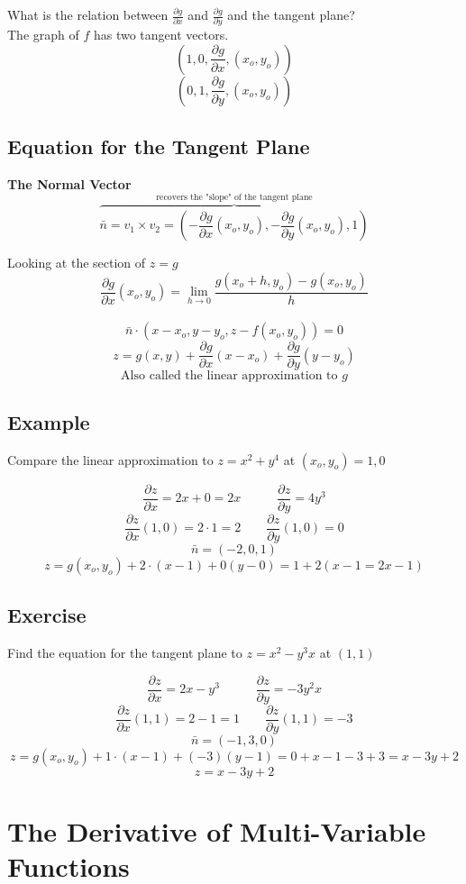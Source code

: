 \documentclass{article}
\begin{document}
What is the relation between $\frac{\partial g}{\partial x}$ and $\frac{\partial g}{\partial y}$ and the tangent plane?\\

The graph of $f$ has two tangent vectors.
\[(1,0,\frac{\partial g}{\partial x},(x_o,y_o))\]
\[(0,1,\frac{\partial g}{\partial y},(x_o,y_o))\]

\subsection{Equation for the Tangent Plane}

\textbf{The Normal Vector}
\[\overbrace{\bar{n}=v_1\times v_2=(-\frac{\partial g}{\partial x}(x_o,y_o),-\frac{\partial g}{\partial y}(x_o,y_o),1)}^{\mbox{recovers the "slope" of the tangent plane}}\]

Looking at the section of $z=g$
\[\frac{\partial g}{\partial x}(x_o,y_o)=\lim_{h\rightarrow 0}\frac{g(x_{o}+h,y_o)-g(x_{o},y_{o})}{h}\]\\

\[\bar{n}\cdot (x-x_o,y-y_o,z-f(x_o,y_o))=0\]
\[z=g(x,y)+\frac{\partial g}{\partial x}(x-x_o)+\frac{\partial g}{\partial y}(y-y_o)\]
\[\mbox{Also called the linear approximation to $g$}\]

\subsection*{Example}
Compare the linear approximation to $z=x^2+y^4$ at $(x_o,y_o)=1,0$


\[\frac{\partial z}{\partial x}=2x+0=2x\qquad\;\;\; \frac{\partial z}{\partial y}=4y^3\]
\[\frac{\partial z}{\partial x}(1,0)=2\cdot 1=2\qquad \frac{\partial z}{\partial y}(1,0)=0\]
\[\bar{n}=(-2,0,1)\]
\[z=g(x_o,y_o)+2\cdot(x-1)+0(y-0)=1+2(x-1=2x-1)\]


\subsection*{Exercise}
Find the equation for the tangent plane to $z=x^2-y^{3}x$ at $(1,1)$

\[\frac{\partial z}{\partial x}=2x-y^3\qquad\;\;\; \frac{\partial z}{\partial y}=-3y^{2}x\]
\[\frac{\partial z}{\partial x}(1,1)=2-1=1\qquad \frac{\partial z}{\partial y}(1,1)=-3\]
\[\bar{n}=(-1,3,0)\]
\[z=g(x_o,y_o)+1\cdot (x-1)+(-3)(y-1)=0+x-1-3+3=x-3y+2\]
\[z=x-3y+2\]

\section{The Derivative of Multi-Variable Functions}
\end{document}
